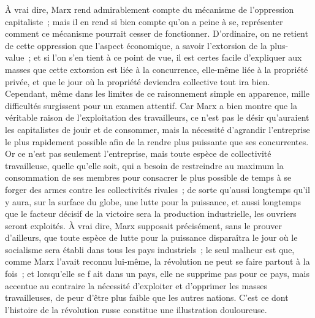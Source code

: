 \documentclass[french,twoside]{book} %
\begin{document}
À vrai dire, Marx rend admirablement compte du mécanisme de l'oppression capitaliste ; mais il en rend si bien compte qu’on a peine à se, représenter comment ce mécanisme pourrait cesser de fonctionner. D'ordinaire, on ne retient de cette oppression que l'aspect économique, a savoir l'extorsion de la plus-value ; et si l'on s'en tient à ce point de vue, il est certes facile d'expliquer aux masses que cette extorsion est liée à la concurrence, elle-même liée à la propriété privée, et que le jour où la propriété deviendra collective tout ira bien. Cependant, même dans les limites de ce raisonnement simple en apparence, mille difficultés surgissent pour un examen attentif. Car Marx a bien montre que la véritable raison de l'exploitation des travailleurs, ce n'est pas le désir qu'auraient les capitalistes de jouir et de consommer, mais la nécessité d'agrandir l'entreprise le plus rapidement possible afin de la rendre plus puissante que ses concurrentes. Or ce n'est pas seulement l'entreprise, mais toute espèce de collectivité travailleuse, quelle qu'elle soit, qui a besoin de restreindre au maximum la consommation de ses membres pour consacrer le plus possible de temps à se forger des armes contre les collectivités rivales ; de sorte qu'aussi longtemps qu'il y aura, sur la surface du globe, une lutte pour la puissance, et aussi longtemps que le facteur décisif de la victoire sera la production industrielle, les ouvriers seront exploités. À vrai dire, Marx supposait précisément, sans le prouver d'ailleurs, que toute espèce de lutte pour la puissance disparaîtra le jour où le socialisme sera établi dans tous les pays industriels ; le seul malheur est que, comme Marx l'avait reconnu lui-même, la révolution ne peut se faire partout à la fois ; et lorsqu'elle se f ait dans un pays, elle ne supprime pas pour ce pays, mais accentue au contraire la nécessité d'exploiter et d'opprimer les masses travailleuses, de peur d'être plus faible que les autres nations. C'est ce dont l'histoire de la révolution russe constitue une illustration douloureuse.\par
\end{document}

